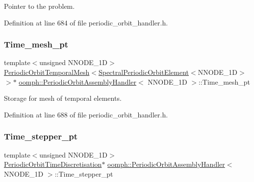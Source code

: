 Pointer to the problem. 



Definition at line 684 of file periodic\+\_\+orbit\+\_\+handler.\+h.

\mbox{\label{classoomph_1_1PeriodicOrbitAssemblyHandler_aa6a4d6fc7cfbfd3a1d8babcc3d0e8a90}} 
\subsubsection{\texorpdfstring{Time\+\_\+mesh\+\_\+pt}{Time\_mesh\_pt}}
{\footnotesize\ttfamily template$<$unsigned N\+N\+O\+D\+E\+\_\+1D$>$ \\
\hyperlink{classoomph_1_1PeriodicOrbitTemporalMesh}{Periodic\+Orbit\+Temporal\+Mesh}$<$\hyperlink{classoomph_1_1SpectralPeriodicOrbitElement}{Spectral\+Periodic\+Orbit\+Element}$<$N\+N\+O\+D\+E\+\_\+1D$>$ $>$$\ast$ \hyperlink{classoomph_1_1PeriodicOrbitAssemblyHandler}{oomph\+::\+Periodic\+Orbit\+Assembly\+Handler}$<$ N\+N\+O\+D\+E\+\_\+1D $>$\+::Time\+\_\+mesh\+\_\+pt\hspace{0.3cm}{\ttfamily [private]}}



Storage for mesh of temporal elements. 



Definition at line 688 of file periodic\+\_\+orbit\+\_\+handler.\+h.

\mbox{\label{classoomph_1_1PeriodicOrbitAssemblyHandler_ae2a8149c7cd33e41765ef080e1654e81}} 
\subsubsection{\texorpdfstring{Time\+\_\+stepper\+\_\+pt}{Time\_stepper\_pt}}
{\footnotesize\ttfamily template$<$unsigned N\+N\+O\+D\+E\+\_\+1D$>$ \\
\hyperlink{classoomph_1_1PeriodicOrbitTimeDiscretisation}{Periodic\+Orbit\+Time\+Discretisation}$\ast$ \hyperlink{classoomph_1_1PeriodicOrbitAssemblyHandler}{oomph\+::\+Periodic\+Orbit\+Assembly\+Handler}$<$ N\+N\+O\+D\+E\+\_\+1D $>$\+::Time\+\_\+stepper\+\_\+pt\hspace{0.3cm}{\ttfamily [private]}}



